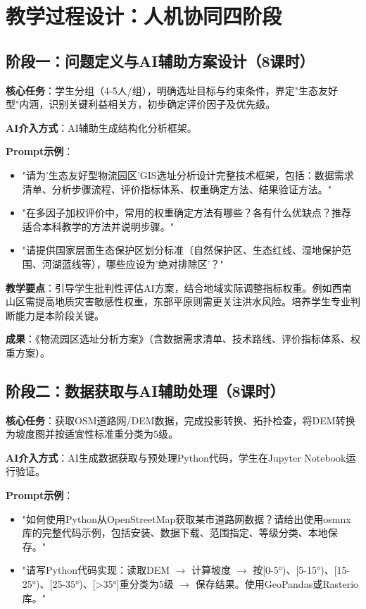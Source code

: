 \section{教学过程设计：人机协同四阶段}

\subsection{阶段一：问题定义与AI辅助方案设计（8课时）}

\textbf{核心任务}：学生分组（4-5人/组），明确选址目标与约束条件，界定"生态友好型"内涵，识别关键利益相关方，初步确定评价因子及优先级。

\textbf{AI介入方式}：AI辅助生成结构化分析框架。

\textbf{Prompt示例}：
\begin{itemize}
\item "请为'生态友好型物流园区'GIS选址分析设计完整技术框架，包括：数据需求清单、分析步骤流程、评价指标体系、权重确定方法、结果验证方法。"
\item "在多因子加权评价中，常用的权重确定方法有哪些？各有什么优缺点？推荐适合本科教学的方法并说明步骤。"
\item "请提供国家层面生态保护区划分标准（自然保护区、生态红线、湿地保护范围、河湖蓝线等），哪些应设为'绝对排除区'？"
\end{itemize}

\textbf{教学要点}：引导学生批判性评估AI方案，结合地域实际调整指标权重。例如西南山区需提高地质灾害敏感性权重，东部平原则需更关注洪水风险。培养学生专业判断能力是本阶段关键。

\textbf{成果}：《物流园区选址分析方案》（含数据需求清单、技术路线、评价指标体系、权重方案）。

\subsection{阶段二：数据获取与AI辅助处理（8课时）}

\textbf{核心任务}：获取OSM道路网/DEM数据，完成投影转换、拓扑检查，将DEM转换为坡度图并按适宜性标准重分类为5级。

\textbf{AI介入方式}：AI生成数据获取与预处理Python代码，学生在Jupyter Notebook运行验证。

\textbf{Prompt示例}：
\begin{itemize}
\item "如何使用Python从OpenStreetMap获取某市道路网数据？请给出使用osmnx库的完整代码示例，包括安装、数据下载、范围指定、等级分类、本地保存。"
\item "请写Python代码实现：读取DEM $\rightarrow$ 计算坡度 $\rightarrow$ 按[0-5°)、[5-15°)、[15-25°)、[25-35°)、[>35°]重分类为5级 $\rightarrow$ 保存结果。使用GeoPandas或Rasterio库。"
\end{itemize}

